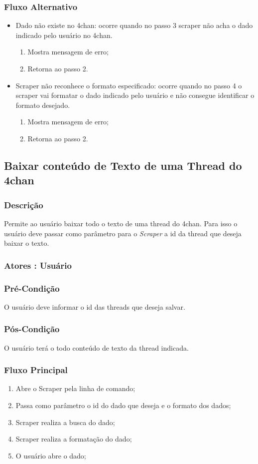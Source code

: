 \subsubsection{Fluxo Alternativo}
\begin{itemize}
    \item Dado não existe no 4chan: ocorre quando no passo 3 scraper não acha o dado indicado pelo usuário no 4chan.
    \begin{enumerate}
        \item Mostra mensagem de erro;
        \item Retorna ao passo 2.
    \end{enumerate}
    \item Scraper não reconhece o formato especificado: ocorre quando no passo 4 o scraper vai formatar o dado indicado pelo usuário e não consegue identificar o formato desejado.
    \begin{enumerate}
        \item Mostra mensagem de erro;
        \item Retorna ao passo 2.
    \end{enumerate}
\end{itemize}


\subsection{Baixar conteúdo de Texto de uma Thread do 4chan}
\subsubsection{Descrição}
Permite ao usuário baixar todo o texto de uma thread do 4chan. Para isso o usuário deve passar como parâmetro para o \textit{Scraper} a id da thread que deseja baixar o texto.
\subsubsection{Atores : Usuário}
\subsubsection{Pré-Condição}
O usuário deve informar o id das threads que deseja salvar.
\subsubsection{Pós-Condição}
O usuário terá o todo conteúdo de texto da thread indicada.
\subsubsection{Fluxo Principal}
\begin{enumerate}
    \item Abre o Scraper pela linha de comando;
    \item Passa como parâmetro o id do dado que deseja e o formato dos dados;
    \item Scraper realiza a busca do dado;
    \item Scraper realiza a formatação do dado;
    \item O usuário abre o dado;
\end{enumerate}
